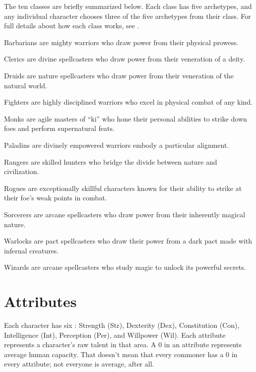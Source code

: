     The ten classes are briefly summarized below.
    Each class has five archetypes, and any individual character chooses three of the five archetypes from their class.
    For full details about how each class works, see .
    \begin{raggeditemize}
        \item Barbarians are mighty warriors who draw power from their physical prowess.
        \item Clerics are divine spellcasters who draw power from their veneration of a deity.
        \item Druids are nature spellcasters who draw power from their veneration of the natural world.
        \item Fighters are highly disciplined warriors who excel in physical combat of any kind.
        \item Monks are agile masters of ``ki'' who hone their personal abilities to strike down foes and perform supernatural feats.
        \item Paladins are divinely empowered warriors embody a particular alignment.
        \item Rangers are skilled hunters who bridge the divide between nature and civilization.
        \item Rogues are exceptionally skillful characters known for their ability to strike at their foe's weak points in combat.
        \item Sorcerers are arcane spellcasters who draw power from their inherently magical nature.
        \item Warlocks are pact spellcasters who draw their power from a dark pact made with infernal creatures.
        \item Wizards are arcane spellcasters who study magic to unlock its powerful secrets.
    \end{raggeditemize}

\section{Attributes}\label{Attributes}

    Each character has six : Strength (Str), Dexterity (Dex), Constitution (Con), Intelligence (Int), Perception (Per), and Willpower (Wil).
    Each attribute represents a character's raw talent in that area.
    A 0 in an attribute represents average human capacity.
    That doesn't mean that every commoner has a 0 in every attribute; not everyone is average, after all.

